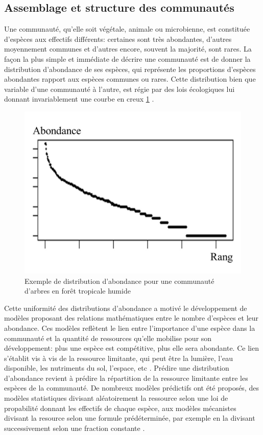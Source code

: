 \documentclass[
  11pt,
  french,
  A4paper,
  extrafontsizes,onecolumn,openright
  ]{memoir}
\begin{document}
\subsection{Assemblage et structure des
communautés}\label{AbundanceDistribution}

Une communauté, qu'elle soit végétale, animale ou microbienne, est
constituée d'espèces aux effectifs différents: certaines sont très
abondantes, d'autres moyennement communes et d'autres encore, souvent la
majorité, sont rares. La façon la plus simple et immédiate de décrire
une communauté est de donner la distribution d'abondance de ses espèces,
qui représente les proportions d'espèces abondantes rapport aux espèces
communes ou rares. Cette distribution bien que variable d'une communauté
à l'autre, est régie par des lois écologiques lui donnant invariablement
une courbe en creux \ref{fig:AbdDist} \autocite{McGill2007}.

\begin{figure}

{\centering \includegraphics[width=0.6\linewidth]{ExternalFig/SpeciesAbdDist} 

}

\caption{Exemple de distribution d'abondance pour une communauté d'arbres en forêt tropicale humide}\label{fig:AbdDist}
\end{figure}

Cette uniformité des distributions d'abondance a motivé le développement
de modèles proposant des relations mathématiques entre le nombre
d'espèces et leur abondance. Ces modèles reflètent le lien entre
l'importance d'une espèce dans la communauté et la quantité de
ressources qu'elle mobilise pour son développement: plus une espèce est
compétitive, plus elle sera abondante. Ce lien s'établit vis à vis de la
ressource limitante, qui peut être la lumière, l'eau disponible, les
nutriments du sol, l'espace, etc
\autocites{Silvertown2004}{terSteege2006}. Prédire une distribution
d'abondance revient à prédire la répartition de la ressource limitante
entre les espèces de la communauté. De nombreux modèles prédictifs ont
été proposés, des modèles statistiques divisant aléatoirement la
ressource selon une loi de propabilité donnant les effectifs de chaque
espèce, aux modèles mécanistes divisant la resource selon une formule
prédéterminée, par exemple en la divisant successivement selon une
fraction constante
\autocites{Fisher1943}{Motomura1932}{Tokeshi1993}{Magurran1988}.
\end{document}
